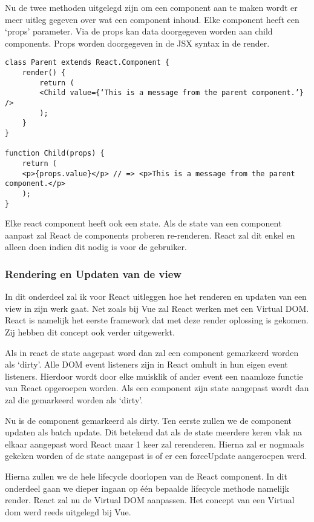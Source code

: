 Nu de twee methoden uitgelegd zijn om een component aan te maken wordt er meer uitleg gegeven over wat een component inhoud. Elke component heeft een ‘props’ parameter. Via de props kan data doorgegeven worden aan child components. Props worden doorgegeven in de JSX syntax in de render.

\begin{verbatim}
class Parent extends React.Component {
	render() {
		return (
		<Child value={‘This is a message from the parent component.’} />
		);
	}
}

function Child(props) {
	return (
	<p>{props.value}</p> // => <p>This is a message from the parent component.</p>
	);
}
\end{verbatim}

Elke react component heeft ook een state. Als de state van een component aanpast zal React de components proberen re-renderen. React zal dit enkel en alleen doen indien dit nodig is voor de gebruiker.

\subsubsection{Rendering en Updaten van de view}
\label{sec:React_Rendering_Updaten}
In dit onderdeel zal ik voor React uitleggen hoe het renderen en updaten van een view in zijn werk gaat. Net zoals bij Vue zal React werken met een Virtual DOM. React is namelijk het eerste framework dat met deze render oplossing is gekomen. Zij hebben dit concept ook verder uitgewerkt.

Als in react de state aagepast word dan zal een component gemarkeerd worden als ‘dirty’. Alle DOM event listeners zijn in React omhult in hun eigen event listeners. Hierdoor wordt door elke muisklik of ander event een naamloze functie van React opgeroepen worden. Als een component zijn state aangepast wordt dan zal die gemarkeerd worden als ‘dirty’.

Nu is de component gemarkeerd als dirty. Ten eerste zullen we de component updaten als batch update. Dit betekend dat als de state meerdere keren vlak na elkaar aangepast word React maar 1 keer zal rerenderen. Hierna zal er nogmaals gekeken worden of de state aangepast is of er een forceUpdate aangeroepen werd.

Hierna zullen we de hele lifecycle doorlopen van de React component. In dit onderdeel gaan we dieper ingaan op één bepaalde lifecycle methode namelijk render. React zal nu de Virtual DOM aanpassen. Het concept van een Virtual dom werd reeds uitgelegd bij Vue.

